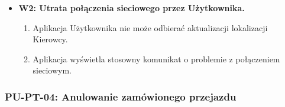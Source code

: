 \documentclass[a4paper,12pt]{article}
\begin{document}
\begin{itemize}
\begin{itemize}
\begin{enumerate}
                \end{enumerate}
            \item \textbf{W2: Utrata połączenia sieciowego przez Użytkownika.}
                \begin{enumerate}
                    \item Aplikacja Użytkownika nie może odbierać aktualizacji lokalizacji Kierowcy.
                    \item Aplikacja wyświetla stosowny komunikat o problemie z połączeniem sieciowym.
                \end{enumerate}
        \end{itemize}
\end{itemize}

\subsubsection{PU-PT-04: Anulowanie zamówionego przejazdu}
\end{document}
